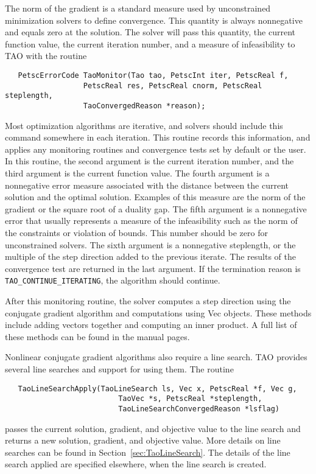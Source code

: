 The norm of the gradient is a standard measure used
by unconstrained minimization solvers to define convergence.
This quantity is always nonnegative and equals zero at the solution.  
The solver will pass this quantity, the current
function value, the current iteration number, and a measure of
infeasibility to TAO with the routine
\begin{verbatim}
   PetscErrorCode TaoMonitor(Tao tao, PetscInt iter, PetscReal f,
                  PetscReal res, PetscReal cnorm, PetscReal steplength,
                  TaoConvergedReason *reason);
\end{verbatim}
Most optimization algorithms are iterative, and solvers should
include this command somewhere in each iteration.  This routine
records this information, and applies any monitoring routines and 
convergence tests set by default or the user.
In this routine, the second argument is the current
iteration number, and the third argument is the current function value.
The fourth argument is a nonnegative error measure associated with the
distance between the current solution and the optimal solution.  Examples
of this measure are the norm of the gradient or the square root of a duality 
gap. The fifth argument is a nonnegative error 
that usually
represents a measure of the infeasibility
such as the norm of the constraints or violation of bounds.
This number should be zero for unconstrained solvers.
The sixth argument is a nonnegative steplength, 
or the multiple of the step direction added to the previous iterate.
The results of the convergence test are returned in the last argument.
If the termination reason is {\tt TAO\_CONTINUE\_ITERATING}, the
algorithm should continue.

After this monitoring routine, the solver computes a step direction
using the conjugate gradient algorithm and computations using Vec objects.  
These methods include
adding vectors together and computing an inner product.  A full list
of these methods can be found in the manual pages.

Nonlinear conjugate gradient algorithms also require a line search.  TAO
provides several line searches and support for using them.
The routine
\begin{verbatim}
   TaoLineSearchApply(TaoLineSearch ls, Vec x, PetscReal *f, Vec g, 
                          TaoVec *s, PetscReal *steplength, 
                          TaoLineSearchConvergedReason *lsflag)
\end{verbatim}
passes the current solution, gradient, and objective value to the
line search and returns a new solution, gradient, and objective value.  More
details on line searches can be found in Section~\ref{sec:TaoLineSearch}.
The details of the line search applied are specified elsewhere, when
the line search is created.

